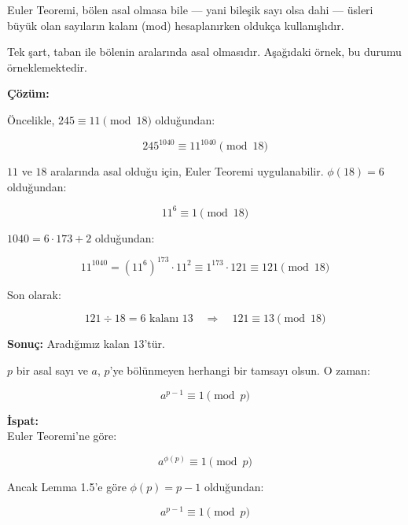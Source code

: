 \documentclass[12pt]{article}
\begin{document}
\vspace{2em}

\begin{tcolorbox}[colback=blue!3, colframe=blue!70!black, title=\textbf{Euler Teoreminin Uygulaması Üzerine Not}, fonttitle=\bfseries, sharp corners]
Euler Teoremi, bölen asal olmasa bile — yani bileşik sayı olsa dahi — üsleri büyük olan sayıların kalanı (mod) hesaplanırken oldukça kullanışlıdır. 

Tek şart, taban ile bölenin aralarında asal olmasıdır. Aşağıdaki örnek, bu durumu örneklemektedir.
\end{tcolorbox}

\vspace{2em}

\begin{tcolorbox}[colback=gray!5, colframe=black, title=\textbf{Örnek 1.25: $245^{1040}$ ifadesinin 18 ile bölümünden kalanı bulunuz}, fonttitle=\bfseries, sharp corners]

\textbf{Çözüm:}

Öncelikle, $245 \equiv 11 \pmod{18}$ olduğundan:

\[
245^{1040} \equiv 11^{1040} \pmod{18}
\]

$11$ ve $18$ aralarında asal olduğu için, Euler Teoremi uygulanabilir. $\phi(18) = 6$ olduğundan:

\[
11^6 \equiv 1 \pmod{18}
\]

$1040 = 6 \cdot 173 + 2$ olduğundan:

\[
11^{1040} = (11^6)^{173} \cdot 11^2 \equiv 1^{173} \cdot 121 \equiv 121 \pmod{18}
\]

Son olarak:

\[
121 \div 18 = 6 \text{ kalanı } 13 \quad \Rightarrow \quad 121 \equiv 13 \pmod{18}
\]

\textbf{Sonuç:} Aradığımız kalan $13$'tür.

\end{tcolorbox}

\vspace{2em}

\begin{tcolorbox}[colback=blue!5, colframe=blue!50!black, title=\textbf{Sonuç 1.26 (Fermat'nın Küçük Teoremi)}, fonttitle=\bfseries, sharp corners]

$p$ bir asal sayı ve $a$, $p$'ye bölünmeyen herhangi bir tamsayı olsun. O zaman:

\[
a^{p - 1} \equiv 1 \pmod{p}
\]

\textbf{İspat:} \\
Euler Teoremi'ne göre:

\[
a^{\phi(p)} \equiv 1 \pmod{p}
\]

Ancak Lemma 1.5'e göre $\phi(p) = p - 1$ olduğundan:

\[
a^{p - 1} \equiv 1 \pmod{p}
\]
\end{tcolorbox}
\end{document}
